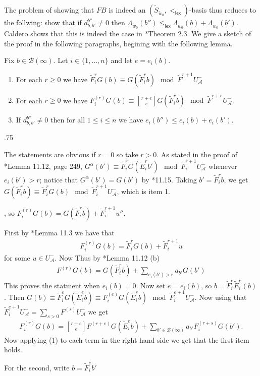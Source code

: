 \documentclass[11pt,fleqn]{article}
\makeatletter
\renewenvironment{proof}[1][\textit{Proof}]{\par
  \pushQED{\qed}%
  \normalfont \topsep.75\paraskip\relax
  \trivlist
  \item[\hskip\labelsep
        \itshape
    #1\@addpunct{.}]\ignorespaces
}{%
  \popQED\endtrivlist\@endpefalse
}
\newcommand\qbinom[2]{\genfrac{[}{]}{0pt}{1}{#1}{#2}}
\newcommand\A{\mathcal A}
\newcommand\B{\mathcal B}
\newcommand\lex{\mathsf{lex}}
\newcommand\flagbasis{FB}
\makeatother
\begin{document}
The problem of showing that $\flagbasis$ is indeed an $(\tilde S_{\tilde w_0}, 
<_{\lex})$-basis thus reduces to the follwing: show that if $d_{b,b'}^{b''} 
\neq 0$ then $\Lambda_{\tilde w_0}(b'') \leq_{\lex} \Lambda_{\tilde w_0}(b) + 
\Lambda_{\tilde w_0}(b')$. Caldero shows that this is indeed the case in 
\cite{C}*{Theorem 2.3}. We give a sketch of the proof in the following 
paragraphs, begining with the following lemma.

\begin{Lemma}
Fix $b \in \B(\infty)$. Let $i \in \{1, \ldots, n\}$ and let $e = e_i(b)$.
\begin{enumerate}
\item For each $r \geq 0$ we have $\tilde F_i^r G(b) \equiv G(\tilde F_i^r b)
\mod \tilde F^{r+1} U_\A^-$  

\item For each $r \geq 0$ we have $F_i^{(r)} G(b) \equiv \qbinom{r+e}{e} 
G(\tilde F_i^r b) \mod \tilde F^{r+e} U_\A^-$.

\item If $d_{b,b'}^{b''} \neq 0$ then for all $1 \leq i \leq n$ we have 
$e_i(b'') \leq e_i(b) + e_i(b')$.
\end{enumerate}
\end{Lemma}
\begin{proof}
The statements are obvious if $r = 0$ so take $r > 0$.
As stated in the proof of \cite{Jan}*{Lemma 11.12}, page 249, $G^\alpha(b') 
\equiv \tilde F_i^r  G(\tilde E_i^r b') \mod \tilde F_i^{r+1} U^-_\A$ whenever
$e_i(b') > r$; notice that $G^\alpha(b') = G(b')$ by \cite{Jan}*{11.15}. 
Taking $b' = \tilde F_i^r b$, we get $G(\tilde F_i^r b) \equiv \tilde F_i^r 
G(b) \mod \tilde F_i^{r+1}U_\A^-$, which is item 1.



, so
$F_i^{(r)} G(b) = G(\tilde F_i^r b) + \tilde F_i^{r+1}u''$.


First by \cite{Jan}*{Lemma 11.3} we have that
\begin{align*}
F_i^{(r)} G(b) = \tilde F_i^r G(b) + \tilde F_i^{r+1}u 
\end{align*}
for some $u \in U_\A^-$. Now 
Thus by \cite{Jan}*{Lemma 11.12 (b)}
\begin{align}
F^{(r)}G(b) = G(\tilde F_i^r b) + \sum_{e_i(b') > r} a_{b'} 
G(b')
\end{align}
This proves the statment when $e_i(b) = 0$. Now set $e = e_i(b)$, so 
$b = \tilde F_i^e \tilde E_i^e (b)$. Then $G(b) \equiv \tilde F_i^e 
G(\tilde E_i^e b) \equiv F_i^{(e)} G(\tilde E_i^r b) \mod \tilde F_i^{e+1} 
U_\A^-$. Now using that $\tilde F_i^{e+1} U_\A^- = \sum_{s>0} F^{(s)} 
U_\A^-$ we get
\begin{align*}
F^{(r)}_i G(b) = \qbinom{r+e}{e} F^{(r+e)} G(\tilde E_i^e b) +
\sum_{b' \in \B(\infty)} a_{b'} F_i^{(r+s)} G(b').
\end{align*}
Now applying (1) to each term in the right hand side we get that the first 
item holds.

For the second, write $b = \tilde F_i^e b'$
\end{proof}
\end{document}
